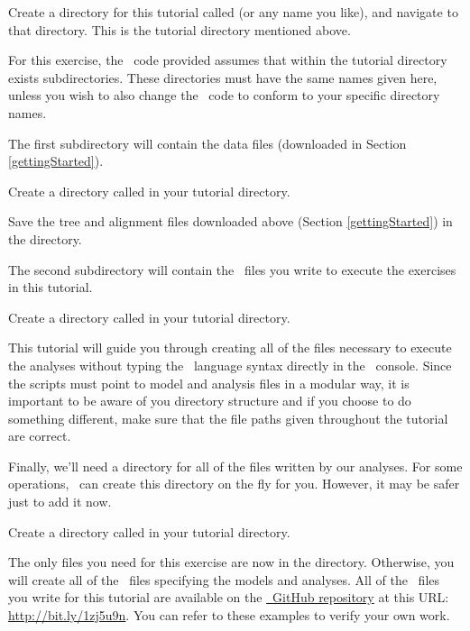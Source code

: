 \begin{framed}
Create a directory for this tutorial called {\textcolor{red}{}} (or any name you like), and navigate to that directory. This is the tutorial directory mentioned above.
\end{framed}

For this exercise, the \Rev~code provided assumes that within the tutorial directory exists  subdirectories. 
These directories must have the same names given here, unless you wish to also change the \Rev~code to conform to your specific directory names.

The first subdirectory will contain the data files (downloaded in Section \ref{gettingStarted}).
\begin{framed}
Create a directory called {\textcolor{red}{}} in your tutorial directory. 

Save the tree and alignment files downloaded above (Section \ref{gettingStarted}) in the  directory.
\end{framed}

The second subdirectory will contain the \Rev~files you write to execute the exercises in this tutorial. 
\begin{framed}
Create a directory called {\textcolor{red}{}} in your tutorial directory. 
\end{framed}
This tutorial will guide you through creating all of the files necessary to execute the analyses without typing the \Rev~language syntax directly in the \RevBayes~console. 
Since the scripts must point to model and analysis files in a modular way, it is important to be aware of you directory structure and if you choose to do something different, make sure that the file paths given throughout the tutorial are correct.

Finally, we'll need a directory for all of the files written by our analyses. For some operations, \RevBayes~can create this directory on the fly for you. 
However, it may be safer just to add it now.
\begin{framed}
Create a directory called {\textcolor{red}{}} in your tutorial directory.
\end{framed}

The only files you need for this exercise are now in the  directory. Otherwise, you will create all of the \Rev~files specifying the models and analyses. 
All of the \Rev~files you write for this tutorial are available on the \href{https://github.com/revbayes/revbayes}{\RevBayes~GitHub repository} at this URL: \href{http://bit.ly/1zj5u9n}{http://bit.ly/1zj5u9n}.
You can refer to these examples to verify your own work.

